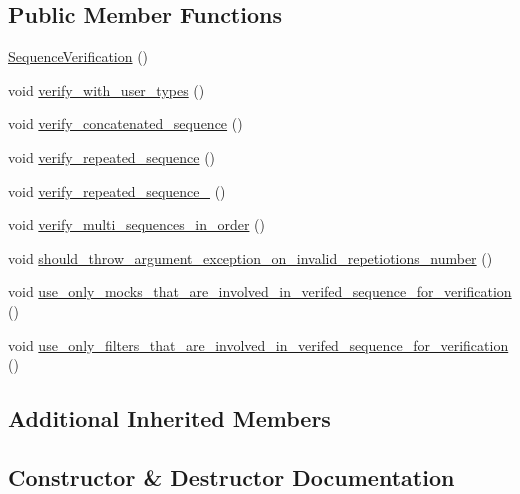 \subsection*{Public Member Functions}
\begin{DoxyCompactItemize}
\item 
\mbox{\hyperlink{structSequenceVerification_abb335aa187f0c0184fc29ad7a8b29459}{Sequence\+Verification}} ()
\item 
void \mbox{\hyperlink{structSequenceVerification_aae1f93a5f98cf06f3948d44d24cd9a1b}{verify\+\_\+with\+\_\+user\+\_\+types}} ()
\item 
void \mbox{\hyperlink{structSequenceVerification_a94df80b73e843bbdde306d3a6237e259}{verify\+\_\+concatenated\+\_\+sequence}} ()
\item 
void \mbox{\hyperlink{structSequenceVerification_a9f95bd393bc17d9532208c563f3391f0}{verify\+\_\+repeated\+\_\+sequence}} ()
\item 
void \mbox{\hyperlink{structSequenceVerification_a171627c81605a7d8076648a6b3e2742a}{verify\+\_\+repeated\+\_\+sequence\+\_}} ()
\item 
void \mbox{\hyperlink{structSequenceVerification_a3bd4b18a3da7acb2a30ef842400e7ef4}{verify\+\_\+multi\+\_\+sequences\+\_\+in\+\_\+order}} ()
\item 
void \mbox{\hyperlink{structSequenceVerification_a68686c8d18c1624c342c052b26339cb7}{should\+\_\+throw\+\_\+argument\+\_\+exception\+\_\+on\+\_\+invalid\+\_\+repetiotions\+\_\+number}} ()
\item 
void \mbox{\hyperlink{structSequenceVerification_a2c72c33292383012c848032b10b82b1b}{use\+\_\+only\+\_\+mocks\+\_\+that\+\_\+are\+\_\+involved\+\_\+in\+\_\+verifed\+\_\+sequence\+\_\+for\+\_\+verification}} ()
\item 
void \mbox{\hyperlink{structSequenceVerification_aec70d2a7e254eb9e882653c952e42470}{use\+\_\+only\+\_\+filters\+\_\+that\+\_\+are\+\_\+involved\+\_\+in\+\_\+verifed\+\_\+sequence\+\_\+for\+\_\+verification}} ()
\end{DoxyCompactItemize}
\subsection*{Additional Inherited Members}


\subsection{Constructor \& Destructor Documentation}
\mbox{\label{structSequenceVerification_abb335aa187f0c0184fc29ad7a8b29459}} 
